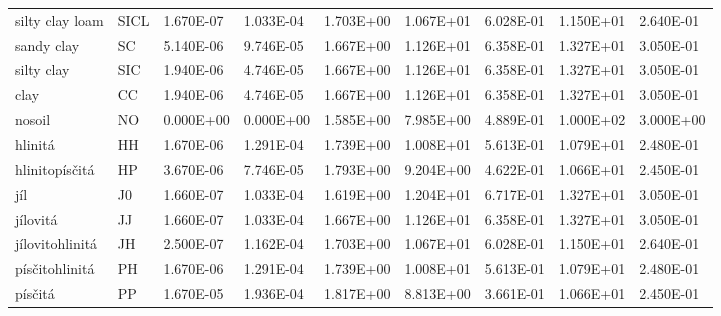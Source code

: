 \begin{sidewaystable}
{\begin{tabular}{lllllllll}
silty clay loam & SICL & 1.670E-07 & 1.033E-04 & 1.703E+00 & 1.067E+01 & 6.028E-01 & 1.150E+01 & 2.640E-01 \\
sandy clay      & SC   & 5.140E-06 & 9.746E-05 & 1.667E+00 & 1.126E+01 & 6.358E-01 & 1.327E+01 & 3.050E-01 \\
silty clay      & SIC  & 1.940E-06 & 4.746E-05 & 1.667E+00 & 1.126E+01 & 6.358E-01 & 1.327E+01 & 3.050E-01 \\
clay            & CC   & 1.940E-06 & 4.746E-05 & 1.667E+00 & 1.126E+01 & 6.358E-01 & 1.327E+01 & 3.050E-01 \\
nosoil          & NO   & 0.000E+00 & 0.000E+00 & 1.585E+00 & 7.985E+00 & 4.889E-01 & 1.000E+02 & 3.000E+00 \\
hlinitá         & HH   & 1.670E-06 & 1.291E-04 & 1.739E+00 & 1.008E+01 & 5.613E-01 & 1.079E+01 & 2.480E-01 \\
hlinitopísčitá  & HP   & 3.670E-06 & 7.746E-05 & 1.793E+00 & 9.204E+00 & 4.622E-01 & 1.066E+01 & 2.450E-01 \\
jíl             & J0   & 1.660E-07 & 1.033E-04 & 1.619E+00 & 1.204E+01 & 6.717E-01 & 1.327E+01 & 3.050E-01 \\
jílovitá        & JJ   & 1.660E-07 & 1.033E-04 & 1.667E+00 & 1.126E+01 & 6.358E-01 & 1.327E+01 & 3.050E-01 \\
jílovitohlinitá & JH   & 2.500E-07 & 1.162E-04 & 1.703E+00 & 1.067E+01 & 6.028E-01 & 1.150E+01 & 2.640E-01 \\
písčitohlinitá  & PH   & 1.670E-06 & 1.291E-04 & 1.739E+00 & 1.008E+01 & 5.613E-01 & 1.079E+01 & 2.480E-01 \\
písčitá         & PP   & 1.670E-05 & 1.936E-04 & 1.817E+00 & 8.813E+00 & 3.661E-01 & 1.066E+01 & 2.450E-01 \\
\hline \hline
\end{tabular}
}
\end{sidewaystable}